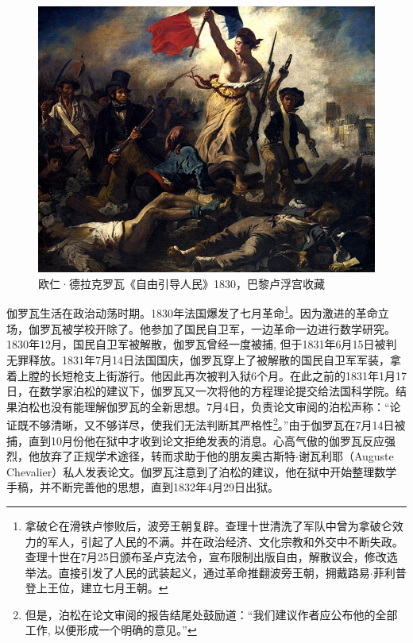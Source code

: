 \documentclass{article}
\begin{document}
\begin{figure}[htbp]
 \centering
 \includegraphics[scale=0.4]{img/lltp.jpg}
 \captionsetup{labelformat=empty}
 \caption{欧仁·德拉克罗瓦《自由引导人民》1830，巴黎卢浮宫收藏}
 \label{fig:Liberty-Leading-the-People}
\end{figure}

伽罗瓦生活在政治动荡时期。1830年法国爆发了七月革命\footnote{拿破仑在滑铁卢惨败后，波旁王朝复辟。查理十世清洗了军队中曾为拿破仑效力的军人，引起了人民的不满。并在政治经济、文化宗教和外交中不断失政。查理十世在7月25日颁布圣卢克法令，宣布限制出版自由，解散议会，修改选举法。直接引发了人民的武装起义，通过革命推翻波旁王朝，拥戴路易$\cdot$菲利普登上王位，建立七月王朝。}。因为激进的革命立场，伽罗瓦被学校开除了。他参加了国民自卫军，一边革命一边进行数学研究。1830年12月，国民自卫军被解散，伽罗瓦曾经一度被捕, 但于1831年6月15日被判无罪释放。1831年7月14日法国国庆，伽罗瓦穿上了被解散的国民自卫军军装，拿着上膛的长短枪支上街游行。他因此再次被判入狱6个月。在此之前的1831年1月17日，在数学家泊松的建议下，伽罗瓦又一次将他的方程理论提交给法国科学院。结果泊松也没有能理解伽罗瓦的全新思想。7月4日，负责论文审阅的泊松声称：“论证既不够清晰，又不够详尽，使我们无法判断其严格性\footnote{但是，泊松在论文审阅的报告结尾处鼓励道：“我们建议作者应公布他的全部工作, 以便形成一个明确的意见。”}。”由于伽罗瓦在7月14日被捕，直到10月份他在狱中才收到论文拒绝发表的消息。心高气傲的伽罗瓦反应强烈，他放弃了正规学术途径，转而求助于他的朋友奥古斯特$\cdot$谢瓦利耶（Auguste Chevalier）私人发表论文。伽罗瓦注意到了泊松的建议，他在狱中开始整理数学手稿，并不断完善他的思想，直到1832年4月29日出狱。
\end{document}
